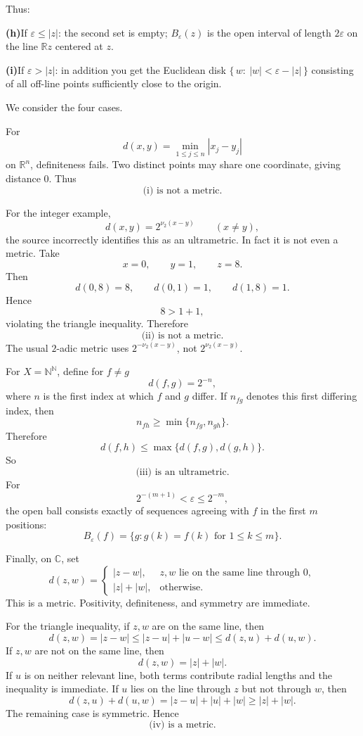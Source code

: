 \begin{problem}[CP-II-0561]
Thus:

	\par\smallskip\noindent\textbf{(h)}\quad If $\varepsilon\le |z|$: the second set is empty; $B_\varepsilon(z)$ is the open interval
	of length $2\varepsilon$ on the line $\mathbb R z$ centered at $z$.
	\par\smallskip\noindent\textbf{(i)}\quad If $\varepsilon>|z|$: in addition you get the Euclidean disk
	$\{\,w:\ |w|<\varepsilon-|z|\,\}$ consisting of all off-line points sufficiently
	close to the origin.
\end{problem}

\begin{solution}
We consider the four cases.

For
\[
d(x,y)
=
\min_{1\le j\le n}|x_j-y_j|
\]
on \(\mathbb R^n\), definiteness fails. Two distinct points may share one coordinate, giving
distance \(0\). Thus
\[
\boxed{\text{(i) is not a metric}.}
\]

For the integer example,
\[
d(x,y)
=
2^{\nu_2(x-y)}
\qquad(x\neq y),
\]
the source incorrectly identifies this as an ultrametric. In fact it is not even a metric.
Take
\[
x=0,\qquad y=1,\qquad z=8.
\]
Then
\[
d(0,8)=8,
\qquad
d(0,1)=1,
\qquad
d(1,8)=1.
\]
Hence
\[
8>1+1,
\]
violating the triangle inequality. Therefore
\[
\boxed{\text{(ii) is not a metric}.}
\]
The usual \(2\)-adic metric uses \(2^{-\nu_2(x-y)}\), not \(2^{\nu_2(x-y)}\).

For \(X=\mathbb N^{\mathbb N}\), define for \(f\neq g\)
\[
d(f,g)=2^{-n},
\]
where \(n\) is the first index at which \(f\) and \(g\) differ. If \(n_{fg}\) denotes this
first differing index, then
\[
n_{fh}
\ge
\min\{n_{fg},n_{gh}\}.
\]
Therefore
\[
d(f,h)
\le
\max\{d(f,g),d(g,h)\}.
\]
So
\[
\boxed{\text{(iii) is an ultrametric}.}
\]
For
\[
2^{-(m+1)}<\varepsilon\le2^{-m},
\]
the open ball consists exactly of sequences agreeing with \(f\) in the first \(m\) positions:
\[
\boxed{
B_\varepsilon(f)
=
\{g:g(k)=f(k)\text{ for }1\le k\le m\}.
}
\]

Finally, on \(\mathbb C\), set
\[
d(z,w)
=
\begin{cases}
|z-w|,
&z,w\text{ lie on the same line through }0,\\
|z|+|w|,
&\text{otherwise}.
\end{cases}
\]
This is a metric. Positivity, definiteness, and symmetry are immediate.

For the triangle inequality, if \(z,w\) are on the same line, then
\[
d(z,w)=|z-w|
\le
|z-u|+|u-w|
\le
d(z,u)+d(u,w).
\]
If \(z,w\) are not on the same line, then
\[
d(z,w)=|z|+|w|.
\]
If \(u\) is on neither relevant line, both terms contribute radial lengths and the inequality
is immediate. If \(u\) lies on the line through \(z\) but not through \(w\), then
\[
d(z,u)+d(u,w)
=
|z-u|+|u|+|w|
\ge
|z|+|w|.
\]
The remaining case is symmetric. Hence
\[
\boxed{\text{(iv) is a metric}.}
\]


\end{solution}
